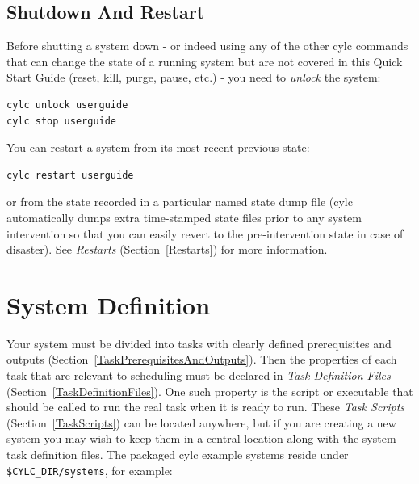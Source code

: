 \documentclass[11pt,a4paper]{article}
\begin{document}
\lstset{language=bash}
\subsection{Shutdown And Restart}
\label{QuickShutdownAndRestart}

\lstset{language=bash}

Before shutting a system down - or indeed using any of the other cylc
commands that can change the state of a running system but are not 
covered in this Quick Start Guide (reset, kill, purge, pause, etc.) -
you need to {\em unlock} the system:

\begin{lstlisting}
cylc unlock userguide
cylc stop userguide
\end{lstlisting}

You can restart a system from its most recent previous state:

\begin{lstlisting}
cylc restart userguide
\end{lstlisting}
or from the state recorded in a particular named state dump file 
(cylc automatically dumps extra time-stamped state files prior to any
system intervention so that you can easily revert to the
pre-intervention state in case of disaster). See {\em Restarts}
(Section~\ref{Restarts}) for more information.

\pagebreak
\section{System Definition} 
\label{SystemDefinition}


Your system must be divided into tasks with clearly defined
prerequisites and outputs (Section~\ref{TaskPrerequisitesAndOutputs}). Then
the properties of each task that are relevant to scheduling must be
declared in {\em Task Definition Files}
(Section~\ref{TaskDefinitionFiles}). One such property is the script or
executable that should be called to run the real task when
it is ready to run. These {\em Task Scripts} (Section~\ref{TaskScripts})
can be located anywhere, but if you are creating a new system you may
wish to keep them in a central location along with the system task
definition files.  The packaged cylc example systems reside under
\lstinline=$CYLC_DIR/systems=, for
example:
\end{document}
